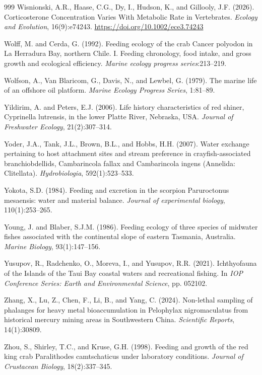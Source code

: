 \begin{thebibliography}{999}
Wisnionski, A.R., Haase, C.G., Dy, I., Hudson, K., and Gillooly, J.F. (2026). Corticosterone Concentration Varies With Metabolic Rate in Vertebrates. \textit{Ecology and Evolution}, 16(9):e74243. \url{https://doi.org/10.1002/ece3.74243}

Wolff, M. and Cerda, G. (1992). Feeding ecology of the crab Cancer polyodon in La Herradura Bay, northern Chile. I. Feeding chronology, food intake, and gross growth and ecological efficiency. \textit{Marine ecology progress series}:213--219.

Wolfson, A., Van Blaricom, G., Davis, N., and Lewbel, G. (1979). The marine life of an offshore oil platform. \textit{Marine Ecology Progress Series}, 1:81--89.

Yildirim, A. and Peters, E.J. (2006). Life history characteristics of red shiner, Cyprinella lutrensis, in the lower Platte River, Nebraska, USA. \textit{Journal of Freshwater Ecology}, 21(2):307--314.

Yoder, J.A., Tank, J.L., Brown, B.L., and Hobbs, H.H. (2007). Water exchange pertaining to host attachment sites and stream preference in crayfish-associated branchiobdellids, Cambarincola fallax and Cambarincola ingens (Annelida: Clitellata). \textit{Hydrobiologia}, 592(1):523--533.

Yokota, S.D. (1984). Feeding and excretion in the scorpion Paruroctonus mesaensis: water and material balance. \textit{Journal of experimental biology}, 110(1):253--265.

Young, J. and Blaber, S.J.M. (1986). Feeding ecology of three species of midwater fishes associated with the continental slope of eastern Tasmania, Australia. \textit{Marine Biology}, 93(1):147--156.

Yusupov, R., Radchenko, O., Moreva, I., and Yusupov, R.R. (2021). Ichthyofauna of the Islands of the Taui Bay coastal waters and recreational fishing. In \textit{IOP Conference Series: Earth and Environmental Science}, pp. 052102.

Zhang, X., Lu, Z., Chen, F., Li, B., and Yang, C. (2024). Non-lethal sampling of phalanges for heavy metal bioaccumulation in Pelophylax nigromaculatus from historical mercury mining areas in Southwestern China. \textit{Scientific Reports}, 14(1):30809.

Zhou, S., Shirley, T.C., and Kruse, G.H. (1998). Feeding and growth of the red king crab Paralithodes camtschaticus under laboratory conditions. \textit{Journal of Crustacean Biology}, 18(2):337--345.

\end{thebibliography}

